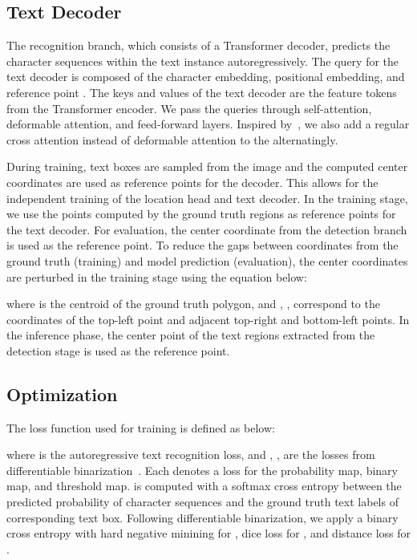 \documentclass[10pt,twocolumn,letterpaper]{article}
\begin{document}
\subsection{Text Decoder}

The recognition branch, which consists of a Transformer decoder, predicts the character sequences within the text instance autoregressively. The query  for the text decoder is composed of the character embedding, positional embedding, and reference point . The keys  and values  of the text decoder are the feature tokens  from the Transformer encoder. We pass the queries through self-attention, deformable attention, and feed-forward layers. Inspired by~\cite{zhu2019, li2021panoptic}, we also add a regular cross attention instead of deformable attention to the  alternatingly.




During training,  text boxes are sampled from the image and the computed center coordinates are used as reference points for the decoder. This allows for the independent training of the location head and text decoder. In the training stage, we use the points computed by the ground truth regions as reference points for the text decoder. For evaluation, the center coordinate from the detection branch is used as the reference point. To reduce the gaps between coordinates from the ground truth (training) and model prediction (evaluation), the center coordinates are perturbed in the training stage using the equation below:


where  is the centroid of the ground truth polygon, and , ,  correspond to the coordinates of the top-left point and adjacent top-right and bottom-left points. In the inference phase, the center point of the text regions extracted from the detection stage is used as the reference point. 







\subsection{Optimization}

The loss function  used for training is defined as below:

where  is the autoregressive text recognition loss, and , ,  are the losses from differentiable binarization~\cite{liao2020real}. Each denotes a loss for the probability map, binary map, and threshold map.  is computed with a softmax cross entropy between the predicted probability of character sequences and the ground truth text labels of corresponding text box. Following differentiable binarization, we apply a binary cross entropy with hard negative minining for , dice loss for , and  distance loss for .
\end{document}
